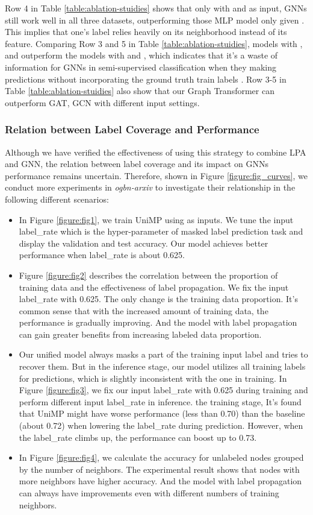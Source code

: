 Row 4 in Table \ref{table:ablation-stuidies} shows that only with  and   as input, GNNs still work well in all three datasets, outperforming those MLP model only given . This implies that one's label relies heavily on its neighborhood instead of its feature. Comparing Row 3 and 5 in Table \ref{table:ablation-stuidies}, models with ,  and  outperform the models with  and , which indicates that it's a waste of information for GNNs in semi-supervised classification when they making predictions without incorporating the ground truth train labels . Row 3-5 in Table \ref{table:ablation-stuidies} also show that our Graph Transformer can outperform GAT, GCN with different input settings.


\subsubsection{Relation between Label Coverage and Performance}

 Although we have verified the effectiveness of using this strategy to combine LPA and GNN, the relation between label coverage and its impact on GNNs performance remains uncertain. Therefore, shown in Figure \ref{figure:fig_curves}, we conduct more experiments in \emph{ogbn-arxiv} to investigate their relationship in the following different scenarios:
\begin{itemize}
	\item In Figure \ref{figure:fig1}, we train UniMP using  as inputs. We tune the input label\_rate which is the hyper-parameter of masked label prediction task and display the validation and test accuracy. Our model achieves better performance when label\_rate is about 0.625.
	\item Figure \ref{figure:fig2} describes the correlation between the proportion of training data and the effectiveness of label propagation. We fix the input label\_rate with 0.625. The only change is the training data proportion. It's common sense that with the increased amount of training data, the performance is gradually improving. And the model with label propagation  can gain greater benefits from increasing labeled data proportion.
	\item Our unified model always masks a part of the training input label and tries to recover them. But in the inference stage, our model utilizes all training labels for predictions, which is slightly inconsistent with the one in training. In Figure \ref{figure:fig3}, we fix our input label\_rate with 0.625 during training and perform different input label\_rate in inference. the training stage, It's found that UniMP might have worse performance (less than 0.70) than the baseline (about 0.72) when lowering the label\_rate during prediction. However, when the label\_rate climbs up, the performance can boost up to 0.73.
	
	\item In Figure \ref{figure:fig4}, we calculate the accuracy for unlabeled nodes grouped by the number of neighbors. The experimental result shows that nodes with more neighbors have higher accuracy. And the model with label propagation  can always have improvements even with different numbers of training neighbors.
\end{itemize}



